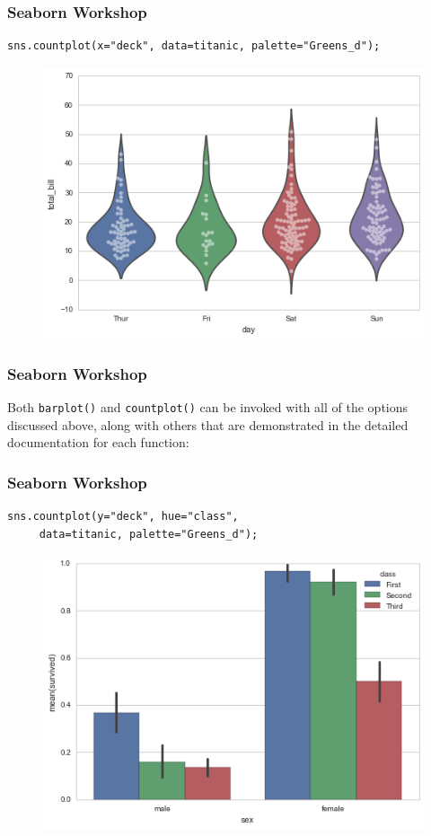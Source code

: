 \documentclass{beamer}
\begin{document}
\begin{frame}[fragile]
	\frametitle{Seaborn Workshop}
	\large
	\begin{verbatim}
sns.countplot(x="deck", data=titanic, palette="Greens_d");
	\end{verbatim}

\begin{figure}
\centering
\includegraphics[width=0.7\linewidth]{images/categorical_31_0}
\end{figure}
\end{frame}
\begin{frame}[fragile]
	\frametitle{Seaborn Workshop}
	\large
Both \texttt{barplot()} and \texttt{countplot()} can be invoked with all of the options discussed above, along with others that are demonstrated in the detailed documentation for each function:
\end{frame}
\begin{frame}[fragile]
	\frametitle{Seaborn Workshop}
	\large
\begin{verbatim}
sns.countplot(y="deck", hue="class", 
     data=titanic, palette="Greens_d");
\end{verbatim}

\begin{figure}
\centering
\includegraphics[width=0.75\linewidth]{images/categorical_33_0}
\end{figure}

\end{frame}
\end{document}
